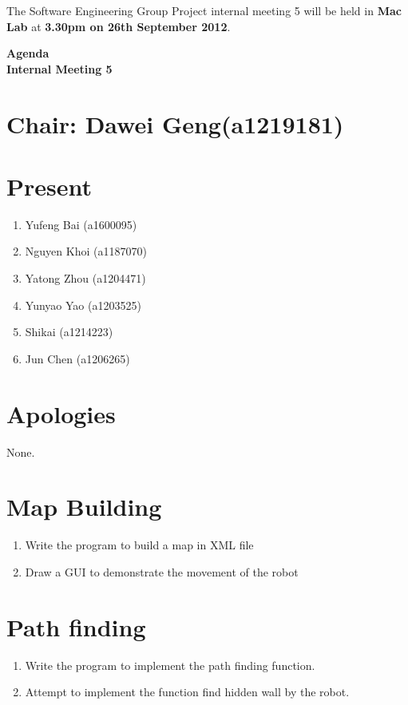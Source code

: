\documentclass[11pt, a4paper]{article}
\begin{document}
\noindent The Software Engineering Group Project internal meeting 5 will be held in {\bf Mac Lab} at {\bf 3.30pm on 26th September 2012}.


\vspace*{15pt}

\begin{center}
\huge \bf Agenda \\Internal Meeting 5
\end{center}



\section*{Chair: Dawei Geng(a1219181)}
\section*{Present}
\begin{enumerate}
\item Yufeng Bai (a1600095)
\item Nguyen Khoi (a1187070)
\item Yatong Zhou (a1204471)
\item Yunyao Yao (a1203525)
\item Shikai (a1214223)
\item Jun Chen (a1206265)
\end{enumerate}
\section{Apologies}
None.

\section{Map Building}

\begin{enumerate}
\item Write the program to build a map in XML file
\item Draw a GUI to demonstrate the movement of the robot
\end{enumerate}

\section{Path finding}
\begin{enumerate}
\item Write the program to implement the path finding function.
\item Attempt to implement the function find hidden wall by the robot.
\end{enumerate}
\end{document}
